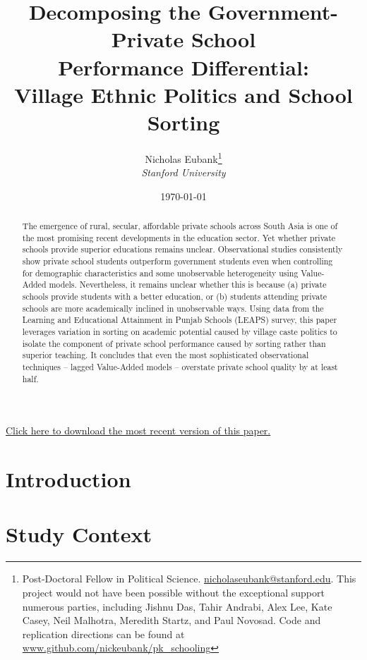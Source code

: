 \documentclass[11pt]{article}
\title{Decomposing the Government-Private School \\ Performance Differential: \\ Village Ethnic Politics and School Sorting}
\author{Nicholas Eubank\footnote{Post-Doctoral Fellow in Political Science. \href{mailto:nicholaseubank@stanford.edu}{nicholaseubank@stanford.edu}. This project would not have been possible without the exceptional support numerous parties, including Jishnu Das, Tahir Andrabi, Alex Lee, Kate Casey, Neil Malhotra, Meredith Startz, and Paul Novosad.  Code and replication directions can be found at \href{http://www.github.com/nickeubank/pk_schooling}{\url{www.github.com/nickeubank/pk_schooling}}} \\ \emph{Stanford University}}
\date{\today}
\begin{document}
\maketitle
\begin{center}
\vspace{1.5cm}

{\Large \color{blue}\href{http://www.nickeubank.com/eubank_schoolsorting/}{Click here to download the most recent version of this paper.}\color{black}}
\vspace{1.5cm}\\

\end{center}

\vspace{0.5cm}

\begin{abstract}
The emergence of rural, secular, affordable private schools across South Asia is one of the most promising recent developments in the education sector. Yet whether private schools provide superior educations remains unclear. Observational studies consistently show private school students outperform government students even when controlling for demographic characteristics and some unobservable heterogeneity using Value-Added models. Nevertheless, it remains unclear whether this is because (a) private schools provide students with a better education, or (b) students attending private schools are more academically inclined in unobservable ways. Using data from the Learning and Educational Attainment in Punjab Schools (LEAPS) survey, this paper leverages variation in sorting on academic potential caused by village caste politics to isolate the component of private school performance caused by sorting rather than superior teaching. It concludes that even the most sophisticated observational techniques -- lagged Value-Added models -- overstate private school quality by at least half. 
\end{abstract}

\thispagestyle{empty}



\pagebreak

\setcounter{page}{1}

\section{Introduction}\label{pk_intro}

	

\section{Study Context}\label{pk_context}
\end{document}
